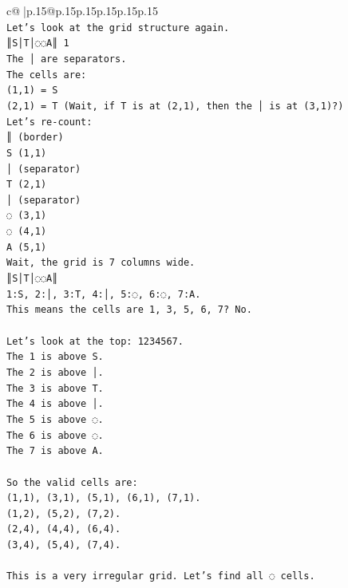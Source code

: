 \documentclass{article}
\begin{document}
{\begin{supertabular}{c@{$\;$}|p{.15\linewidth}@{}p{.15\linewidth}p{.15\linewidth}p{.15\linewidth}p{.15\linewidth}p{.15\linewidth}}
{{{\\ 
\texttt{Let's look at the grid structure again.} \\
\texttt{║S│T│◌◌A║ 1} \\
\texttt{The │ are separators.} \\
\texttt{The cells are:} \\
\texttt{(1,1) = S} \\
\texttt{(2,1) = T (Wait, if T is at (2,1), then the │ is at (3,1)?)} \\
\texttt{Let's re{-}count:} \\
\texttt{║ (border)} \\
\texttt{S (1,1)} \\
\texttt{│ (separator)} \\
\texttt{T (2,1)} \\
\texttt{│ (separator)} \\
\texttt{◌ (3,1)} \\
\texttt{◌ (4,1)} \\
\texttt{A (5,1)} \\
\texttt{Wait, the grid is 7 columns wide.} \\
\texttt{║S│T│◌◌A║} \\
\texttt{1:S, 2:│, 3:T, 4:│, 5:◌, 6:◌, 7:A.} \\
\texttt{This means the cells are 1, 3, 5, 6, 7? No.} \\
\\ 
\texttt{Let's look at the top: 1234567.} \\
\texttt{The 1 is above S.} \\
\texttt{The 2 is above │.} \\
\texttt{The 3 is above T.} \\
\texttt{The 4 is above │.} \\
\texttt{The 5 is above ◌.} \\
\texttt{The 6 is above ◌.} \\
\texttt{The 7 is above A.} \\
\\ 
\texttt{So the valid cells are:} \\
\texttt{(1,1), (3,1), (5,1), (6,1), (7,1).} \\
\texttt{(1,2), (5,2), (7,2).} \\
\texttt{(2,4), (4,4), (6,4).} \\
\texttt{(3,4), (5,4), (7,4).} \\
\\ 
\texttt{This is a very irregular grid. Let's find all ◌ cells.} \\
}}}
\end{supertabular}}
\end{document}
